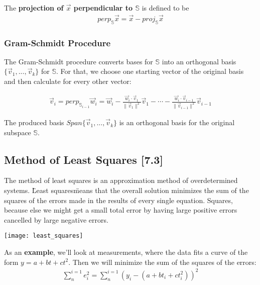 \documentclass[a4paper,9pt]{extarticle}
\begin{document}
\begin{multicols*}{2}
The \textbf{projection of $\vec{x}$ perpendicular to $\mathbb{S}$} is defined to be
\begin{equation} \label{7.2-3}
    \begin{split}
        perp_\mathbb{S} \vec{x} = \vec{x} - proj_\mathbb{S} \vec{x}
    \end{split}
\end{equation}


\subsubsection{Gram-Schmidt Procedure}
The Gram-Schmidt procedure converts bases for $\mathbb{S}$ into an orthogonal basis $\{\vec{v}_1, ..., \vec{v}_k\}$ for $\mathbb{S}$. For that, we choose one starting vector of the original basis and then calculate for every other vector:

\begin{equation} \label{7.2-4}
    \begin{split}
        \vec{v}_i = perp_{\mathbb{S}_{i - 1}} \vec{w}_i = \vec{w}_i - \frac{\vec{w}_i \cdot \vec{v}_1}{\|\vec{v}_1\|^2} \vec{v}_1 - \cdots - \frac{\vec{w}_i \cdot \vec{v}_{i - 1}}{\|\vec{v}_{i - 1}\|^2} \vec{v}_{i - 1}
    \end{split}
\end{equation}

The produced basis $Span \{\vec{v}_1, ..., \vec{v}_k\}$ is an orthogonal basis for the original subspace $\mathbb{S}$.


\subsection{Method of Least Squares [7.3]}
The method of least squares is an approximation method of overdetermined systems. \"Least squares\" means that the overall solution minimizes the sum of the squares of the errors made in the results of every single equation. Squares, because else we might get a small total error by having large positive errors cancelled by large negative errors.

{\centering \texttt{[image: least\_squares]} \par}

As an \textbf{example}, we'll look at measurements, where the data fits a curve of the form $y = a + bt + ct^2$. Then we will minimize the sum of the squares of the errors:
\begin{equation} \label{7.3-1}
    \begin{split}
        \sum_{n}^{i = 1} e_i^2 = \sum_{n}^{i = 1} (y_i - (a + bt_i + ct_i^2))^2
    \end{split}
\end{equation}


\end{multicols*}
\end{document}
